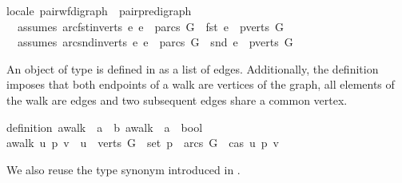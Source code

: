 \begin{isabellebody}
\begin{isamarkuptext}
%
\begin{isabelle}%
locale\ pair{\isacharunderscore}wf{\isacharunderscore}digraph\ {\isacharequal}\ pair{\isacharunderscore}pre{\isacharunderscore}digraph\ {\isacharplus}\isanewline
\ \ assumes\ arc{\isacharunderscore}fst{\isacharunderscore}in{\isacharunderscore}verts{\isacharcolon}\ {\isachardoublequote}{\isasymAnd}e{\isachardot}\ e\ {\isasymin}\ parcs\ G\ {\isasymLongrightarrow}\ fst\ e\ {\isasymin}\ pverts\ G{\isachardoublequote}\isanewline
\ \ assumes\ arc{\isacharunderscore}snd{\isacharunderscore}in{\isacharunderscore}verts{\isacharcolon}\ {\isachardoublequote}{\isasymAnd}e{\isachardot}\ e\ {\isasymin}\ parcs\ G\ {\isasymLongrightarrow}\ snd\ e\ {\isasymin}\ pverts\ G{\isachardoublequote}%
\end{isabelle}

An object of type  is defined in  as a list of edges. 
Additionally, the definition  imposes that both endpoints of a walk are vertices of 
the graph, all elements of the walk are edges and two subsequent edges share a common vertex. \vspace{1em}

\noindent{}

%
\begin{isabelle}%
definition\ awalk\ {\isacharcolon}{\isacharcolon}\ {\isachardoublequote}{\isacharprime}a\ {\isasymRightarrow}\ {\isacharprime}b\ awalk\ {\isasymRightarrow}\ {\isacharprime}a\ {\isasymRightarrow}\ bool{\isachardoublequote}\isanewline
{\isachardoublequote}awalk\ u\ p\ v\ {\isasymequiv}\ u\ {\isasymin}\ verts\ G\ {\isasymand}\ set\ p\ {\isasymsubseteq}\ arcs\ G\ {\isasymand}\ cas\ u\ p\ v{\isachardoublequote}\ %
\end{isabelle}

\noindent We also reuse the type synonym  introduced in \mbox{}. \vspace{1em}

  \vspace{1em}


\end{isamarkuptext}
\end{isabellebody}

